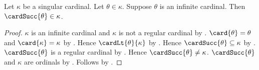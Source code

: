 \begin{proposition}\label{infinite_cardinal_successor_belongs_to_singular_cardinal}
    Let $\kappa$ be a singular cardinal.
    Let $\theta\in\kappa$.
    Suppose $\theta$ is an infinite cardinal.
    Then $\cardSucc{\theta}\in\kappa$.
\end{proposition}
\begin{proof}
    $\kappa$ is an infinite cardinal and $\kappa$ is not a regular cardinal
        by .
    $\card{\theta}=\theta$ and $\card{\kappa}=\kappa$
        by .
    Hence $\cardLt{\theta}{\kappa}$
        by .
    Hence $\cardSucc{\theta}\subseteq\kappa$
        by .
    $\cardSucc{\theta}$ is a regular cardinal
        by .
    Hence $\cardSucc{\theta}\neq\kappa$.
    $\cardSucc{\theta}$ and $\kappa$ are ordinals
        by .
    Follows by .
\end{proof}
